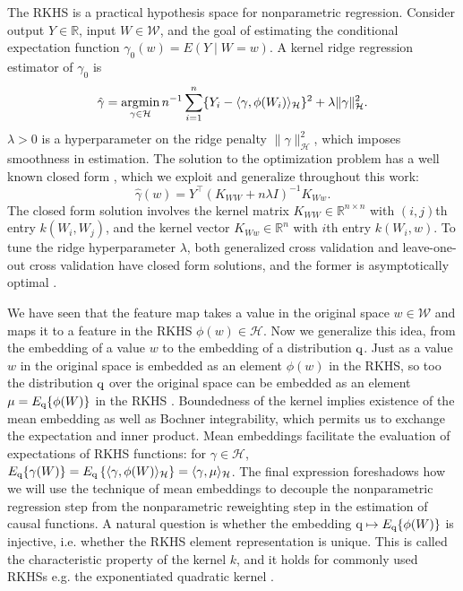 The RKHS is a practical hypothesis space for nonparametric regression. Consider output $Y\in\mathbb{R}$, input $W\in\mathcal{W}$, and the goal of estimating the conditional expectation function $\gamma_0(w)=E(Y \mid W=w)$. A kernel ridge regression estimator of $\gamma_0$ is
\begin{equation}\label{eq:cef_loss}
\hat{\gamma}=\operatorname*{\arg\!\min}_{\gamma \in\mathcal{H}} n^{-1}\sum_{i=1}^n \{Y_i-\langle\gamma,\phi(W_i)\rangle_{\mathcal{H}}\}^2 + \lambda \|\gamma\|^2_{\mathcal{H}}.
\end{equation}
$\lambda>0$ is a hyperparameter on the ridge penalty $\|\gamma\|^2_{\mathcal{H}}$, which imposes smoothness in estimation. The solution to the optimization problem has a well known closed form \cite{kimeldorf1971some}, which we exploit and generalize throughout this work:
\begin{equation}\label{eq:cef_form}
\hat{\gamma}(w)=Y^{\top}(K_{WW}+n\lambda  I )^{-1}K_{Ww}.
\end{equation}
The closed form solution involves the kernel matrix $K_{WW}\in\mathbb{R}^{n\times n}$ with $(i,j)$th entry $k(W_i,W_j)$, and the kernel vector $K_{Ww}\in\mathbb{R}^n$ with $i$th entry $k(W_i,w)$. To tune the ridge hyperparameter $\lambda$, both generalized cross validation and leave-one-out cross validation have closed form solutions, and the former is asymptotically optimal \cite{craven1978smoothing,li1986asymptotic}.

We have seen that the feature map takes a value in the original space $w\in\mathcal{W}$ and maps it to a feature in the RKHS $\phi(w)\in\mathcal{H}$. Now we generalize this idea, from the embedding of a value $w$ to the embedding of a distribution $\text{\normalfont q}$. Just as a value $w$ in the original space  is embedded as an element $\phi(w)$ in the RKHS, so too the distribution $\text{\normalfont q}$ over the original space can be embedded as an element  $\mu=E_{\text{\normalfont q}}\{\phi(W)\}$ in the RKHS \cite{smola2007hilbert,berlinet2011reproducing}. Boundedness of the kernel implies existence of the mean embedding as well as Bochner integrability, which permits us to exchange the expectation and inner product. Mean embeddings facilitate the evaluation of expectations of RKHS functions: for $\gamma \in \mathcal{H}$,
$E_{\text{\normalfont q}}\{\gamma(W)\}=E_{\text{\normalfont q}}\left\{\langle \gamma,\phi(W) \rangle_{\mathcal{H}}\right\}=\langle \gamma,\mu \rangle_{\mathcal{H}}$. The final expression foreshadows how we will use the technique of mean embeddings to decouple the nonparametric regression step from the nonparametric reweighting step in the estimation of causal functions. A natural question is whether the embedding $\text{\normalfont q}\mapsto E_{\text{\normalfont q}}\{\phi(W)\}$ is injective, i.e. whether the RKHS element representation is unique. This is called the characteristic property of the kernel $k$, and it holds for commonly used RKHSs e.g. the exponentiated quadratic kernel \cite{sriperumbudur2010relation}.

